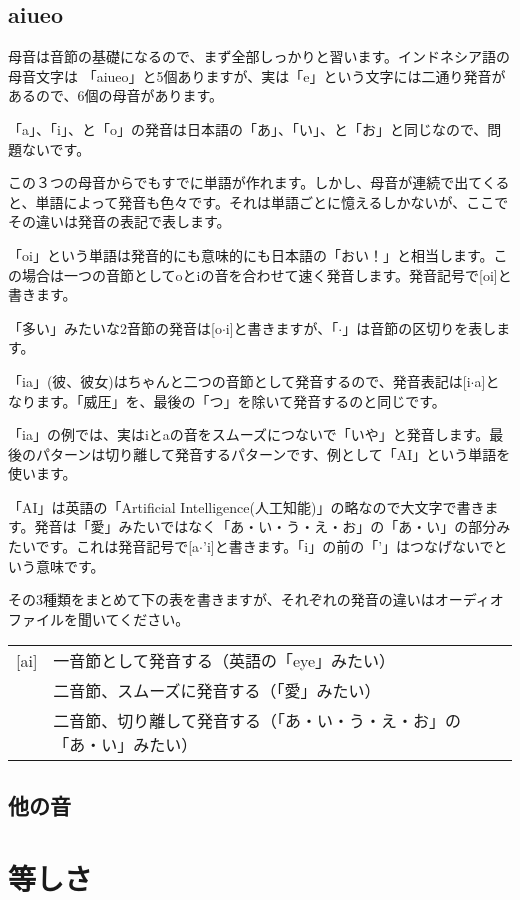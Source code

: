 \documentclass[uplatex]{jsarticle}
\theoremstyle{definition}
\begin{document}
\subsection{aiueo}

母音は音節の基礎になるので、まず全部しっかりと習います。インドネシア語の母音文字は
「aiueo」と5個ありますが、実は「e」という文字には二通り発音があるので、6個の母音があります。

「a」、「i」、と「o」の発音は日本語の「あ」、「い」、と「お」と同じなので、問題ないです。

この３つの母音からでもすでに単語が作れます。しかし、母音が連続で出てくると、単語によって発音も色々です。それは単語ごとに憶えるしかないが、ここでその違いは発音の表記で表します。

「oi」という単語は発音的にも意味的にも日本語の「おい！」と相当します。この場合は一つの音節としてoとiの音を合わせて速く発音します。発音記号で[oi]と書きます。

「多い」みたいな2音節の発音は[o$\cdot$i]と書きますが、「$\cdot$」は音節の区切りを表します。

「ia」(彼、彼女)はちゃんと二つの音節として発音するので、発音表記は[i$\cdot$a]となります。「威圧」を、最後の「つ」を除いて発音するのと同じです。

「ia」の例では、実はiとaの音をスムーズにつないで「いや」と発音します。最後のパターンは切り離して発音するパターンです、例として「AI」という単語を使います。

「AI」は英語の「Artificial
Intelligence(人工知能)」の略なので大文字で書きます。発音は「愛」みたいではなく「あ・い・う・え・お」の「あ・い」の部分みたいです。これは発音記号で[a$\cdot$'i]と書きます。「i」の前の「'」はつなげないでという意味です。

その3種類をまとめて下の表を書きますが、それぞれの発音の違いはオーディオファイルを聞いてください。

\begin{tabular}{ll}
[ai] & 一音節として発音する（英語の「eye」みたい） \\\relax
[a$\cdot$i] & 二音節、スムーズに発音する（「愛」みたい） \\\relax
[a$\cdot$'i] & 二音節、切り離して発音する（「あ・い・う・え・お」の「あ・い」みたい）
\end{tabular}

\subsection{他の音}

\section{等しさ}
\end{document}
